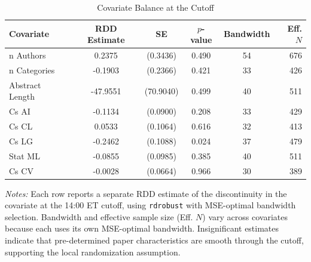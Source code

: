 \begin{table}[htbp]
\centering
\caption{Covariate Balance at the Cutoff}
\label{tab:balance}
\begin{tabular}{lccccr}
\hline\hline
Covariate & RDD Estimate & SE & $p$-value & Bandwidth & Eff. $N$ \\
\hline
n Authors & 0.2375 & (0.3436) & 0.490 & 54 & 676 \\
n Categories & -0.1903 & (0.2366) & 0.421 & 33 & 426 \\
Abstract Length & -47.9551 & (70.9040) & 0.499 & 40 & 511 \\
Cs AI & -0.1134 & (0.0900) & 0.208 & 33 & 429 \\
Cs CL & 0.0533 & (0.1064) & 0.616 & 32 & 413 \\
Cs LG & -0.2462 & (0.1088) & 0.024 & 37 & 479 \\
Stat ML & -0.0855 & (0.0985) & 0.385 & 40 & 511 \\
Cs CV & -0.0028 & (0.0664) & 0.966 & 30 & 389 \\
\hline\hline
\end{tabular}
\begin{minipage}{0.95\textwidth}
\footnotesize
\textit{Notes:} Each row reports a separate RDD estimate of the discontinuity in the covariate at the 14:00 ET cutoff, using \texttt{rdrobust} with MSE-optimal bandwidth selection. Bandwidth and effective sample size (Eff. $N$) vary across covariates because each uses its own MSE-optimal bandwidth. Insignificant estimates indicate that pre-determined paper characteristics are smooth through the cutoff, supporting the local randomization assumption.
\end{minipage}
\end{table}
